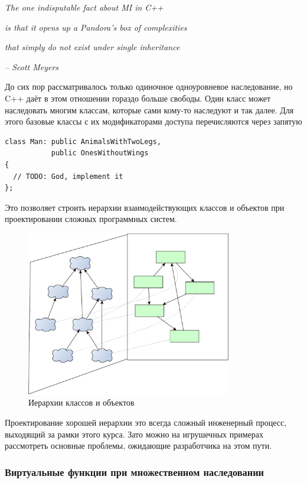 \documentclass[a4paper,12pt,oneside]{article}
\begin{document}
\hfill\textit{The one indisputable fact about MI in C++}

\hfill\textit{is that it opens up a Pandora's box of complexities}

\hfill\textit{that simply do not exist under single inheritance}{\vspace{0.5em}}

\hfill\textit{-- Scott Meyers}

До сих пор рассматривалось только одиночное одноуровневое наследование, но C++ даёт в этом отношении гораздо больше свободы. Один класс может наследовать многим классам, которые сами кому-то наследуют и так далее. Для этого базовые классы с их модификаторами доступа перечисляются через запятую

\begin{lstlisting}
class Man: public AnimalsWithTwoLegs, 
           public OnesWithoutWings 
{
  // TODO: God, implement it
};
\end{lstlisting}

Это позволяет строить иерархии взаимодействующих классов и объектов при проектировании сложных программных систем.

\begin{figure}[h!]
\centering
\includegraphics[width=0.8\textwidth]{illustrations/hierarchies-crop.pdf}
\caption{Иерархии классов и объектов}
\label{fig:hierarchies-crop}
\end{figure}

Проектирование хорошей иерархии это всегда сложный инженерный процесс, выходящий за рамки этого курса. Зато можно на игрушечных примерах рассмотреть основные проблемы, ожидающие разработчика на этом пути.

\subsubsection{Виртуальные функции при множественном наследовании}\label{VirtThunks}
\end{document}
